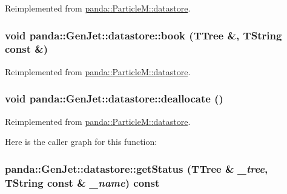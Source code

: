 Reimplemented from \hyperlink{structpanda_1_1ParticleM_1_1datastore_aafc17a88cf8425ff45a00b5fd2eb5751}{panda::ParticleM::datastore}.\hypertarget{structpanda_1_1GenJet_1_1datastore_abfe95213671131d88149b11bbe4a0f45}{
\subsubsection[{book}]{\setlength{\rightskip}{0pt plus 5cm}void panda::GenJet::datastore::book (TTree \&, \/  TString const \&)}}
\label{structpanda_1_1GenJet_1_1datastore_abfe95213671131d88149b11bbe4a0f45}


Reimplemented from \hyperlink{structpanda_1_1ParticleM_1_1datastore_ae2eb76ca042d8b3e899c027ee07b5860}{panda::ParticleM::datastore}.\hypertarget{structpanda_1_1GenJet_1_1datastore_a2b1e39eb4f994f496aa013aaf82998c4}{
\subsubsection[{deallocate}]{\setlength{\rightskip}{0pt plus 5cm}void panda::GenJet::datastore::deallocate ()}}
\label{structpanda_1_1GenJet_1_1datastore_a2b1e39eb4f994f496aa013aaf82998c4}


Reimplemented from \hyperlink{structpanda_1_1ParticleM_1_1datastore_a85c4ce11f1d7c6944a525ad2488880aa}{panda::ParticleM::datastore}.

Here is the caller graph for this function:\hypertarget{structpanda_1_1GenJet_1_1datastore_a38a95477762b562ae4a6f2487e2c26ff}{
\subsubsection[{getStatus}]{ panda::GenJet::datastore::getStatus (TTree \& {\em \_\-tree}, \/  TString const \& {\em \_\-name}) const}}
\label{structpanda_1_1GenJet_1_1datastore_a38a95477762b562ae4a6f2487e2c26ff}


